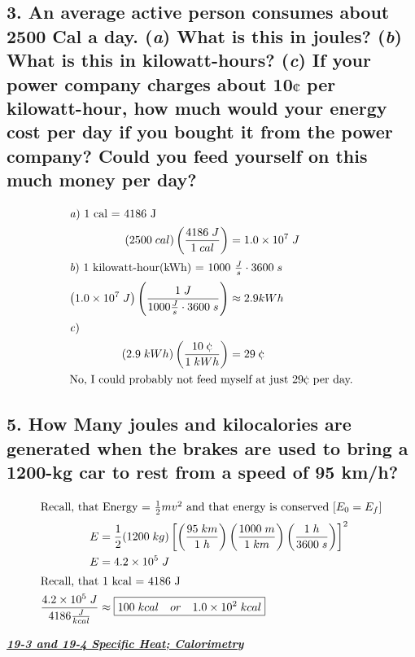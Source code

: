 \documentclass{article}
\begin{document}
\subsection*{3. An average active person consumes about 2500 Cal a day. (\textit a) What is this in joules? (\textit b) What is this in kilowatt-hours? (\textit c) If your power company charges about 10$\cent$ per kilowatt-hour, how much would your energy cost per day if you bought it from the power company? Could you feed yourself on this much money per day?}

\begin{align*}
    \intertext{\textit a) 1 cal = 4186 J}
    \left(2500\;cal\right)\left(\frac{4186\;J}{1\;cal}\right) &= 1.0\times 10^7\;J \\
    \intertext{\textit b) 1 kilowatt-hour(kWh) = 1000 $\frac{J}{s} \cdot 3600\;s$}
    \left(1.0 \times 10^7\;J\right)\left(\frac{1\;J}{1000\frac{J}{s} \cdot 3600\;s}\right) &\approx 2.9 kWh  \\
\intertext{\textit c)}
    \left(2.9\;kWh\right)\left(\frac{10\;\cent}{1\;kWh}\right) &= 29\;\cent \\ 
    \intertext{No, I could probably not feed myself at just 29$\cent$ per day.}
\end{align*}

\subsection*{5. How Many joules and kilocalories are generated when the brakes are used to bring a 1200-kg car to rest from a speed of 95 km/h?}

\begin{align*}
    \intertext{Recall, that Energy = $\frac{1}{2}mv^2$ and that energy is conserved [$E_0 = E_f$]}
    E &= \frac{1}{2}(1200\;kg)\left[\left(\frac{95\;km}{1\;h}\right)\left(\frac{1000\;m}{1\;km}\right)\left(\frac{1\;h}{3600\;s}\right)\right]^2 \\ 
    E &= 4.2 \times 10^5\;J \\ 
    \intertext{Recall, that 1 kcal = 4186 J} 
    \frac{4.2 \times 10^5\;J}{4186 \frac{J}{kcal}} &\approx \boxed{100\;kcal \quad or \quad 1.0 \times 10^2\;kcal} \\ 
\end{align*}    

\newpage
\vspace{1em}
\noindent \large{\textbf{\textit{\underline{19-3 and 19-4 Specific Heat; Calorimetry}}}} \\
\end{document}
